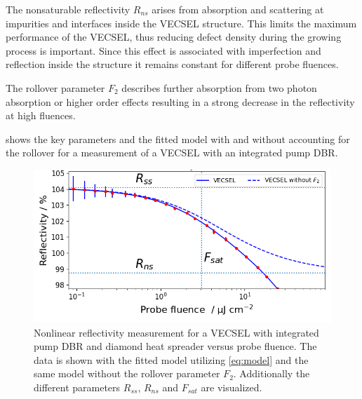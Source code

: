 The nonsaturable reflectivity $R_{ns}$ arises from absorption and scattering at impurities and interfaces inside the VECSEL structure. This limits the maximum performance of the VECSEL, thus reducing defect density during the growing process is important. Since this effect is associated with imperfection and reflection inside the structure it remains constant for different probe fluences. 

The rollover parameter $F_2$ describes further absorption from two photon absorption or higher order effects resulting in a strong decrease in the reflectivity at high fluences.

 shows the key parameters and the fitted model with and without accounting for the rollover for a measurement of a VECSEL with an integrated pump DBR.


\begin{figure}[ht]
    \centering
    \includegraphics[width=12cm]{images/gainSat.png}
    \caption{Nonlinear reflectivity measurement for a VECSEL with integrated pump DBR and diamond heat spreader versus probe fluence. The data is shown with the fitted model utilizing \cref{eq:model} and the same model without the rollover parameter $F_2$. Additionally the different parameters $R_{ss}$, $R_{ns}$ and $F_{sat}$ are visualized.}
    \label{fig:gainSat}
\end{figure}